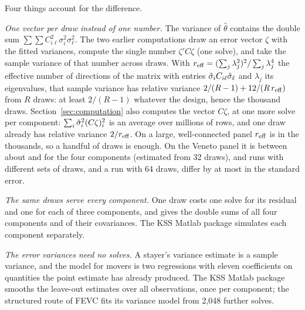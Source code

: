 Four things account for the difference.

\emph{One vector per draw instead of one number.} The variance of $\hat\theta$ contains the double sum
$\sum\sum C_{i\ell}^2\sigma_i^2\sigma_\ell^2$. The two earlier computations draw an error vector $\zeta$ with the
fitted variances, compute the single number $\zeta'C\zeta$ (one solve), and take the sample variance of that
number across draws. With $r_{\rm eff}=(\sum_j\lambda_j^2)^2/\sum_j\lambda_j^4$ the effective number of
directions of the matrix with entries $\tilde\sigma_iC_{i\ell}\tilde\sigma_\ell$ and $\lambda_j$ its eigenvalues, that sample
variance has relative variance $2/(R-1)+12/(R\,r_{\rm eff})$ from $R$ draws: at least $2/(R-1)$ whatever the
design, hence the thousand draws. Section~\ref{sec:computation} also computes the vector $C\zeta$, at one more
solve per component: $\sum_i\tilde\sigma_i^2(C\zeta)_i^2$ is an average over millions of rows, and one draw already has
relative variance $2/r_{\rm eff}$. On a large,
well-connected panel $r_{\rm eff}$ is in the thousands, so a handful of draws is enough. On the Veneto panel it
is between about  and  for the four components (estimated from 32 draws), and
runs with different sets of draws, and a run with 64 draws, differ by at most  in the
standard error.

\emph{The same draws serve every component.} One draw costs one solve for its residual and one for each of
three components, and gives the double sums of all four components and of their covariances. The KSS Matlab package simulates each component separately.

\emph{The error variances need no solves.} A stayer's variance estimate is a sample variance, and the model for
movers is two regressions with eleven coefficients on quantities the point estimate has already produced.
The KSS Matlab package smooths the leave-out estimates over all observations, once per component; the
structured route of FEVC fits its variance model from 2{,}048 further solves.

